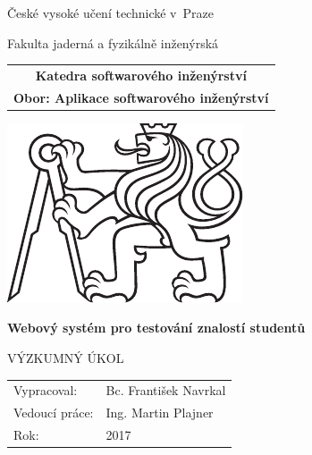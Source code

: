 \documentclass[a4paper,twoside,12pt]{scrbook}
\newcommand{\tb}{\textbf} %
\newcommand{\cvut}{České vysoké učení technické v~Praze}
\newcommand{\fjfi}{Fakulta jaderná a fyzikálně inženýrská}
\newcommand{\ksi}{Katedra softwarového inženýrství}
\newcommand{\obor}{Aplikace softwarového inženýrství} %
\newcommand{\druh}{Výzkumný úkol} %
\newcommand{\logoCVUT}{\includegraphics{symbol_cvut_konturova_verze_cb.pdf}} %
\newcommand{\nazevcz}{Webový systém pro testování znalostí studentů}    %
\newcommand{\nazeven}{}          %
\newcommand{\autor}{Bc. František Navrkal}   %
\newcommand{\vedouci}{Ing. Martin Plajner} %
\newcommand{\rok}{2017}  %
\begin{document}
\thispagestyle{empty}

\begin{center}
	{\LARGE
		\cvut\par
		\fjfi
	}
    \vspace{10mm}

    \begin{tabular}{c}
		\tb{\ksi} \\[3pt]
		\tb{Obor: \obor}\\
    \end{tabular}

   \vspace{10mm} \logoCVUT \vspace{15mm}

   {\huge \tb{\nazevcz}\par}
   \vspace{5mm}
   {\huge \tb{\nazeven}\par}

   \vspace{15mm}
   {\Large \MakeUppercase{\druh}}

   \vfill
   {\large
    \begin{tabular}{ll}
    Vypracoval: & \autor\\
    Vedoucí práce: & \vedouci\\
    Rok: & \rok
    \end{tabular}
   }
\end{center}

\clearpage{\pagestyle{empty}\cleardoublepage} %

\newpage  %
\thispagestyle{empty} %

%
%
%
\end{document}
